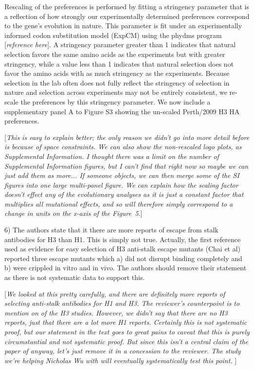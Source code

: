 \documentclass[11pt, oneside]{article}   	%
\newcommand{\comment}[1]{{\color{red}[\textsl{#1}]}}
\newcommand{\response}[1]{{\color{black}#1}}
\begin{document}
\response{Rescaling of the preferences is performed by fitting a stringency parameter that is a reflection of how strongly our experimentally determined preferences correspond to the gene's evolution in nature.
This parameter is fit under an experimentally informed codon substitution model (ExpCM) using the phydms program \comment{reference here}.
A stringency parameter greater than 1 indicates that natural selection favors the same amino acids as the experiments but with greater stringency, while a value less than 1 indicates that natural selection does not favor the amino acids with as much stringency as the experiments.
Because selection in the lab often does not fully reflect the stringency of selection in nature and selection across experiments may not be entirely consistent, we re-scale the preferences by this stringency parameter.
We now include a supplementary panel A to Figure S3 showing the un-scaled Perth/2009 H3 HA preferences.
}

\comment{This is easy to explain better; the only reason we didn't go into more detail before is because of space constraints.
We can also show the non-rescaled logo plots, as Supplemental Information.
I thought there was a limit on the number of Supplemental Information figures, but I can't find that right now so maybe we can just add them as more... If someone objects, we can then merge some of the SI figures into one large multi-panel figure.
We can explain how the scaling factor doesn't effect any of the evolutionary analyses as it is just a constant factor that multiplies all mutational effects, and so will therefore simply correspond to a change in units on the x-axis of the Figure~5.}

6) The authors state that it there are more reports of escape from stalk antibodies for H3 than H1. This is simply not true. Actually, the first reference used as evidence for easy selection of H3 anti-stalk escape mutants (Chai et al) reported three escape mutants which a) did not disrupt binding completely and b) were crippled in vitro and in vivo. The authors should remove their statement as there is not systematic data to support this. 

\comment{We looked at this pretty carefully, and there are definitely more reports of selecting anti-stalk antibodies for H1 and H3.
The reviewer's counterpoint is to mention on of the H3 studies. 
However, we didn't say that there are no H3 reports, just that there are a lot more H1 reports.
Certainly this is not systematic proof, but our statement in the text goes to great pains to caveat that this is purely circumstantial and not systematic proof.
But since this isn't a central claim of the paper of anyway, let's just remove it in a concession to the reviewer.
The study we're helping Nicholas Wu with will eventually systematically test this point.
}
\end{document}
